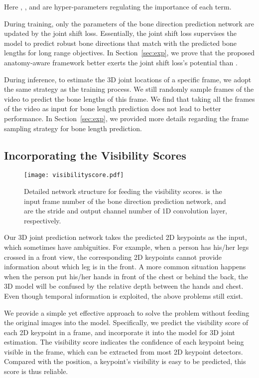 \documentclass[journal]{IEEEtran}
\begin{document}
Here , ,  and  are hyper-parameters regulating the importance of each term.

During training, only the parameters of the bone direction prediction network are updated by the joint shift loss. Essentially, the joint shift loss supervises the model to predict robust bone directions that match with the predicted bone lengths for long range objectives. In Section~\ref{sec:exp}, we prove that the proposed anatomy-aware framework better exerts the joint shift loss's potential than \cite{sun2017compositional}.

During inference, to estimate the 3D joint locations of a specific frame, we adopt the same strategy as the training process. We still randomly sample  frames of the video to predict the bone lengths of this frame. We find that taking all the frames of the video as input for bone length prediction does not lead to better performance. In Section~\ref{sec:exp}, we provided more details regarding the frame sampling strategy for bone length prediction.


\subsection{Incorporating the Visibility Scores} \label{sec:att}
\begin{figure}[!t]
\vspace{-2mm}
\centering
\texttt{[image: visibilityscore.pdf]}

\caption{Detailed network structure for feeding the visibility scores.  is the input frame number of the bone direction prediction network,  and  are the stride and output channel number of 1D convolution layer, respectively.}
\vspace{-1mm}
\label{fig:vs}
\end{figure}

Our 3D joint prediction network takes the predicted 2D keypoints as the input, which sometimes have ambiguities. For example, when a person has his/her legs crossed in a front view, the corresponding 2D keypoints cannot provide information about which leg is in the front. A more common situation happens when the person put his/her hands in front of the chest or behind the back, the 3D model will be confused by the relative depth between the hands and chest. Even though temporal information is exploited, the above problems still exist. 

We provide a simple yet effective approach to solve the problem without feeding the original images into the model. Specifically, we predict the visibility score of each 2D keypoint in a frame, and incorporate it into the model for 3D joint estimation. The visibility score indicates the confidence of each keypoint being visible in the frame, which can be extracted from most 2D keypoint detectors. Compared with the position, a keypoint's visibility is easy to be predicted, this score is thus reliable.
\end{document}
